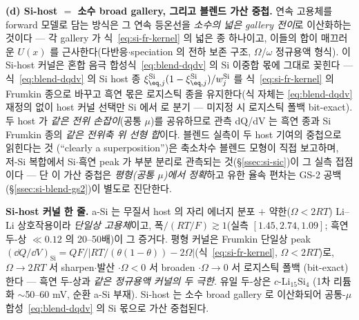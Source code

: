 \textbf{(d) Si-host $=$ 소수 broad gallery, 그리고 블렌드 가산 중첩.} 연속 고용체를 forward 모델로 담는 방식은
그 연속 등온선을 \emph{소수의 넓은 gallery 전이}로 이산화하는 것이다 --- 각 gallery 가 식~\eqref{eq:si-fr-kernel} 의
넓은 종 하나이고, 이들의 합이 매끄러운 $U(x)$ 를 근사한다(다반응$\cdot$speciation 의 전하 보존 구조\cite{verbrugge_lisi2016},
$\Omega$/$\omega$ 정규용액 형식\cite{msmr_origin2017}). 이 Si-host 커널은 혼합 음극 합성식~\eqref{eq:blend-dqdv} 의
Si 이중합 몫에 그대로 꽂힌다 --- 식~\eqref{eq:blend-dqdv} 의 Si host 종
$\xi_{\eq,j}^{\mathrm{Si}}(1-\xi_{\eq,j}^{\mathrm{Si}})/w_j^{\mathrm{Si}}$ 를 식~\eqref{eq:si-fr-kernel} 의 Frumkin
종으로 바꾸고 흑연 몫은 로지스틱 종을 유지한다(식 자체는 \eqref{eq:blend-dqdv} 재정의 없이 host 커널 선택만
Si 에서  로 분기 --- 미지정 시 로지스틱 폴백 bit-exact). 두 host 가 \emph{같은 전위 손잡이}(공통
$\mu$)를 공유하므로 관측 dQ/dV 는 흑연 종과 Si Frumkin 종의 \emph{같은 전위축 위 선형 합}이다. 블렌드 실측이
두 host 기여의 중첩으로 읽힌다는 것
(``clearly a superposition'')은 축소차수 블렌드 모형이 직접 보고하며\cite{tu_blend2024}, 저-Si 복합에서 Si$\cdot$흑연
peak 가 부분 분리로 관측되는 것(\S\ref{ssec:si-sic}\cite{naboka_sic2021})이 그 실측 접점이다 --- 단 이 가산 중첩은
\emph{평형(공통 $\mu$)에서 정확}하고 유한 율속 편차는 GS-2 공백(\S\ref{ssec:si-blend-gs2})이 별도로 진단한다.

\begin{keybox}
\textbf{Si-host 커널 한 줄.} a-Si 는 무질서 host 의 자리 에너지 분포 $+$ 약한($\Omega<2RT$) Li--Li 상호작용이라
\emph{단일상 고용체}이고, 폭$/(RT/F)\!\gtrsim\!1$(실측 $[1.45,2.74,1.09]$; 흑연 두-상 $\ll0.12$ 의 20--50배)이 그
증거다. 평형 커널은 Frumkin 단일상 peak
$(\dd Q/\dd V)_{\mathrm{Si}}=QF/|RT/(\theta(1-\theta))-2\Omega|$(식~\eqref{eq:si-fr-kernel}, $\Omega<2RT$)로,
$\Omega\!\to\!2RT$ 서 sharpen$\cdot$발산 $\cdot$$\Omega<0$ 서 broaden $\cdot$$\Omega\!\to\!0$ 서 로지스틱 폴백
(bit-exact)한다 --- 흑연 두-상과 \emph{같은 정규용액 커널의 두 극한}. 유일 두-상은 $c$-$\mathrm{Li_{15}Si_4}$
(1차 리튬화 $\sim$50--60 mV, 순환 a-Si 부재). Si-host 는 소수 broad gallery 로 이산화되어 공통-$\mu$
합성~\eqref{eq:blend-dqdv} 의 Si 몫으로 가산 중첩된다\cite{tu_blend2024}.
\end{keybox}

